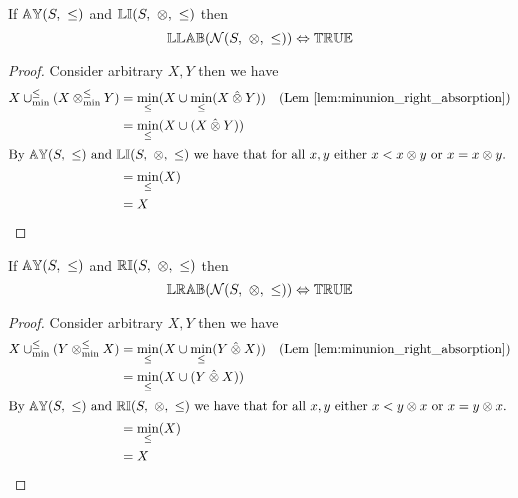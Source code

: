 \begin{theorem} \label{thm:N_llab}
If ${\mathbb{AY}}(S,\ \leq)$ and ${\mathbb{LI}}(S,\ \otimes,\ \leq)$ then
\begin{equation*}
\propname{LLAB}(\mathcal{N}(S,\ \otimes,\ \leq)) \Leftrightarrow \propname{TRUE}
\end{equation*}
\end{theorem}

\begin{proof}

\vspace{0.5em}
Consider arbitrary $X, Y$ then we have
\begin{align*}
X \minunion (X \minlift Y) 	& = \min_\leq(X \cup \min_\leq(X \lift Y)) & \text{(Lem \ref{lem:minunion_right_absorption})} \\
							& = \min_\leq(X \cup (X \lift Y)) \\
\intertext{By $\propname{AY}(S,\ \leq)$ and $\propname{LI}(S,\ \otimes,\ \leq)$ we have that for all $x, y$ either $x < x \otimes y$ or $x = x \otimes y$.}
							& = \min_\leq(X) \\
							& = X
\end{align*}
\end{proof}



\begin{theorem} \label{thm:N_lrab}
If ${\mathbb{AY}}(S,\ \leq)$ and ${\mathbb{RI}}(S,\ \otimes,\ \leq)$ then
\begin{equation*}
\propname{LRAB}(\mathcal{N}(S,\ \otimes,\ \leq)) \Leftrightarrow \propname{TRUE}
\end{equation*}
\end{theorem}

\begin{proof}

\vspace{0.5em}
Consider arbitrary $X, Y$ then we have
\begin{align*}
X \minunion (Y \minlift X) 	& = \min_\leq(X \cup \min_\leq(Y \lift X)) & \text{(Lem \ref{lem:minunion_right_absorption})} \\
							& = \min_\leq(X \cup (Y \lift X)) \\
\intertext{By $\propname{AY}(S,\ \leq)$ and $\propname{RI}(S,\ \otimes,\ \leq)$ we have that for all $x, y$ either $x < y \otimes x$ or $x = y \otimes x$.}
							& = \min_\leq(X) \\
							& = X
\end{align*}
\end{proof}



